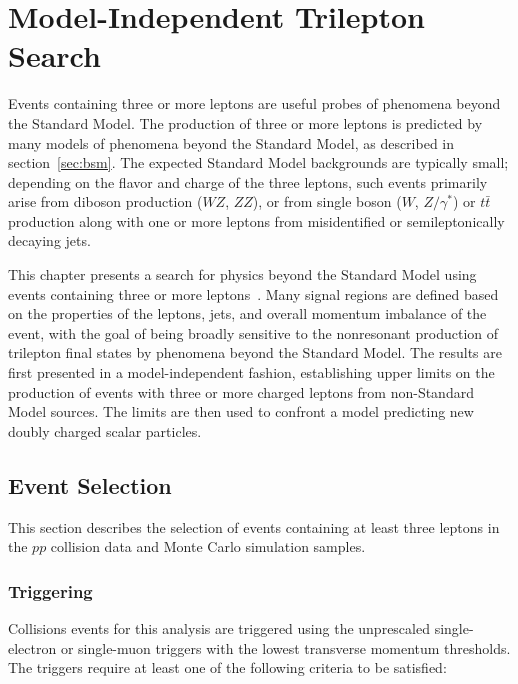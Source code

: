 \chapter{Model-Independent Trilepton Search}\label{ch:model-independent-trilepton-search}

Events containing three or more leptons are useful probes of phenomena beyond the Standard Model. The production of three or more leptons is predicted by many models of phenomena beyond the Standard Model, as described in section~\ref{sec:bsm}. The expected Standard Model backgrounds are typically small; depending on the flavor and charge of the three leptons, such events primarily arise from diboson production ($WZ$, $ZZ$), or from single boson ($W$, $Z/\gamma^{*}$) or $t\bar{t}$ production along with one or more leptons from misidentified or semileptonically decaying jets.

This chapter presents a search for physics beyond the Standard Model using events containing three or more leptons~\cite{Aad:2014hja}. 
Many signal regions are defined based on the properties of the leptons, jets, and overall momentum imbalance of the event, with the goal of being broadly sensitive to the nonresonant production of trilepton final states by phenomena beyond the Standard Model. The results are first presented in a model-independent fashion, establishing upper limits on the production of events with three or more charged leptons from non-Standard Model sources. The limits are then used to confront a model predicting new doubly charged scalar particles. 

\section{Event Selection}\label{sec:model-independent-event-selection}

This section describes the selection of events containing at least three leptons in the $pp$ collision data and Monte Carlo simulation samples. 

\subsection{Triggering}\label{sec:model-independent-event-selection-triggering}
Collisions events for this analysis are triggered using the unprescaled single-electron or single-muon triggers with the lowest transverse momentum thresholds. The triggers require at least one of the following criteria to be satisfied:

